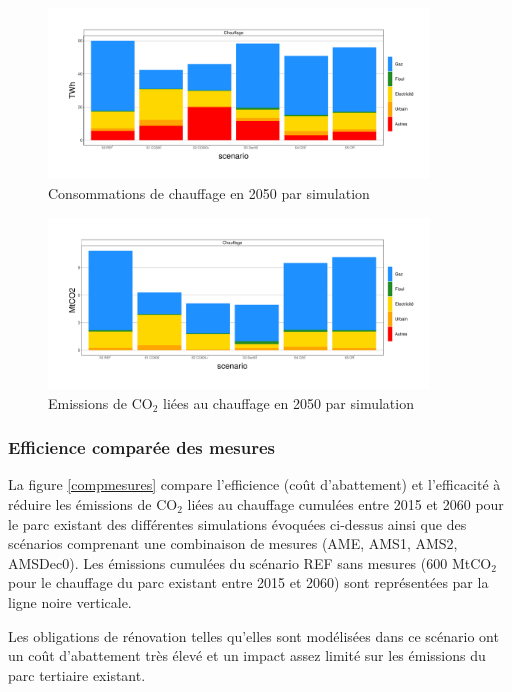 \documentclass[10.5pt,a4paper]{article}
\begin{document}
{\begin{figure}[h!]
\centering 
\caption{Consommations de chauffage en 2050 par simulation}\label{comp_cible_AMS_energie_chauffage-1}  
\includegraphics[width = 0.9\textwidth]{comp_cible_AMS_energie_chauffage-1}  
\end{figure}

\begin{figure}[h!]
\centering 
\caption{Emissions de CO$_2$ liées au chauffage en 2050 par simulation}\label{Em_chauffage_2050-1}  
\includegraphics[width = 0.9\textwidth]{Em_chauffage_2050-1}  
\end{figure}

\subsubsection{Efficience comparée des mesures}

La figure \ref{compmesures} compare l'efficience (coût d'abattement) et l'efficacité à réduire les émissions de CO$_2$ liées au chauffage cumulées entre 2015 et 2060 pour le parc existant des différentes simulations évoquées ci-dessus ainsi que des scénarios comprenant une combinaison de mesures (AME, AMS1, AMS2, AMSDec0). Les émissions cumulées du scénario REF sans mesures (600 MtCO$_2$ pour le chauffage du parc existant entre 2015 et 2060)  sont représentées par la ligne noire verticale.

Les obligations de rénovation telles qu'elles sont modélisées dans ce scénario ont un coût d'abattement très élevé et un impact assez limité sur les émissions du parc tertiaire existant. 

}
\end{document}
